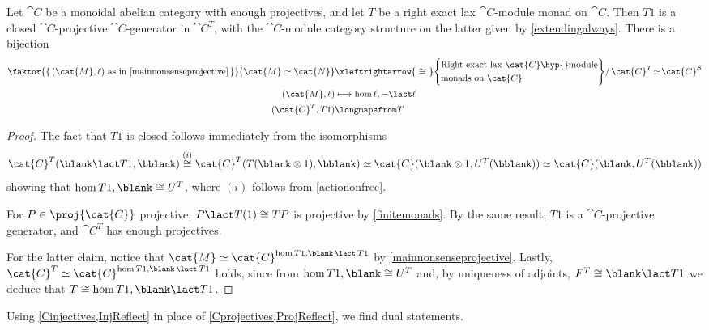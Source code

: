 \begin{theorem}\label{projcorrespondence}
  Let \(\cat{C}\) be a monoidal abelian category with enough projectives,
  and let \(T\) be a right exact lax \(\cat{C}\)\hyp{}module monad on \(\cat{C}\).
  Then \(T1\) is a closed \(\cat{C}\)\hyp{}projective \(\cat{C}\)\hyp{}generator in \(\cat{C}^T\),
  with the \(\cat{C}\)\hyp{}module category structure on the latter given by \cref{extendingalways}.
  There is a bijection
  \begin{align*}
    \faktor{\{\,(\cat{M},\ell) \text{ as in \cref{mainnonsenseprojective}}\,\}}{\cat{M} \simeq \cat{N}}
    &\xleftrightarrow{\ \cong\ }
      \Bigg\{
      \begin{aligned}
        &\text{Right exact lax \(\cat{C}\)\hyp{}module}\\
        &\text{monads on \(\cat{C}\)}
      \end{aligned}
      \Bigg\}
      /\, \cat{C}^T \!\simeq\! \cat{C}^S \\
    (\cat{M},\ell) &\longmapsto \hom{\ell,-\lact \ell} \\
    (\cat{C}^T, T1) &\longmapsfrom T
  \end{align*}
\end{theorem}
\begin{proof}
  The fact that \(T1\) is closed follows immediately from the isomorphisms
  \[
    \cat{C}^T(\blank \lact T1, \bblank)
    \overset{(i)}{\cong} \cat{C}^T(T(\blank \otimes 1), \bblank)
    \simeq \cat{C}(\blank \otimes 1, U^T(\bblank))
    \simeq \cat{C}(\blank, U^T(\bblank))
  \]
  showing that \(\hom{T1, \blank} \cong U^T\),
  where \((i)\) follows from \cref{actiononfree}.

  For \(P \in \proj{\cat{C}}\) projective, \(P \lact T(1) \cong TP\) is projective by \cref{finitemonads}.
  By the same result, \(T1\) is a \(\cat{C}\)\hyp{}projective generator,
  and \(\cat{C}^T\) has enough projectives.

  For the latter claim, notice that \(\cat{M} \simeq \cat{C}^{\hom{T1, \blank \,\lact\, T1}}\) by \cref{mainnonsenseprojective}.
  Lastly, \(\cat{C}^T \simeq \cat{C}^{\hom{T1, \blank \,\lact\, T1}}\) holds,
  since from \(\hom{T1, \blank} \cong U^T\) and, by uniqueness of adjoints, \(F^T \cong \blank \lact T1\)
  we deduce that \(T \cong \hom{T1, \blank \lact T1}\).
\end{proof}

Using \cref{Cinjectives,InjReflect} in place of \cref{Cprojectives,ProjReflect}, we find dual statements.

